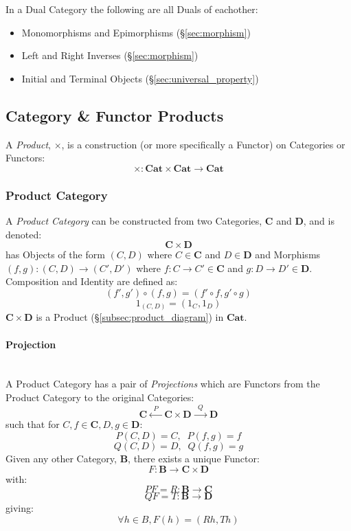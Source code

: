 In a Dual Category the following are all Duals of eachother:
\begin{itemize}
    \item Monomorphisms and Epimorphisms (\S\ref{sec:morphism})
    \item Left and Right Inverses (\S\ref{sec:morphism})
    \item Initial and Terminal Objects (\S\ref{sec:universal_property})
\end{itemize}



\subsection{Category \& Functor Products}\label{subsec:category_product}

A \emph{Product}, $\times$, is a construction (or more specifically a
Functor) on Categories or Functors:
\[
    \times : \mathbf{Cat} \times \mathbf{Cat} \rightarrow \mathbf{Cat}
\]



\subsubsection{Product Category}\label{subsec:product_category}

A \emph{Product Category} can be constructed from two Categories,
$\mathbf{C}$ and $\mathbf{D}$, and is denoted:
\[
    \mathbf{C} \times \mathbf{D}
\]
has Objects of the form $(C,D)$ where $C \in \mathbf{C}$ and $D \in
\mathbf{D}$ and Morphisms $(f,g) : (C,D) \rightarrow (C',D')$ where $f
: C \rightarrow C' \in \mathbf{C}$ and $g : D \rightarrow D' \in
\mathbf{D}$. Composition and Identity are defined as:
\[
    (f',g') \circ (f,g) = (f' \circ f,g' \circ g)
\]\[
    1_{(C,D)} = (1_C, 1_D)
\]
$\mathbf{C} \times \mathbf{D}$ is a Product
(\S\ref{subsec:product_diagram}) in $\mathbf{Cat}$.



\paragraph{Projection}\label{subsec:projection_functor}
\hfill \\
A Product Category has a pair of \emph{Projections} which are Functors
from the Product Category to the original Categories:
\[
    \mathbf{C} \xleftarrow{\;\; P\;\;} \mathbf{C}\times\mathbf{D}
    \xrightarrow{\;\; Q\;\;} \mathbf{D}
\]
such that for $C,f \in \mathbf{C}, D,g \in \mathbf{D}$:
\[
    P(C,D) = C, \;\; P(f,g) = f
\]\[
    Q(C,D) = D, \;\; Q(f,g) = g
\]
Given any other Category, $\mathbf{B}$, there exists a unique Functor:
\[
    F : \mathbf{B} \rightarrow \mathbf{C} \times \mathbf{D}
\]
with:
\[
    PF = R : \mathbf{B} \rightarrow \mathbf{C}
\]\[
    QF = T : \mathbf{B} \rightarrow \mathbf{D}
\]
giving:
\[
    \forall h \in B, F(h) = (Rh,Th)
\]



